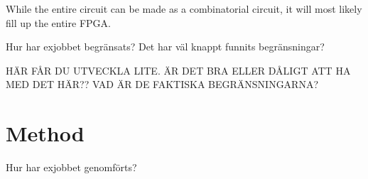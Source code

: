 While the entire circuit can be made as a combinatorial circuit, it 
will most likely fill up the entire FPGA.

Hur har exjobbet begränsats? Det har väl knappt funnits begränsningar?

HÄR FÅR DU UTVECKLA LITE. ÄR DET BRA ELLER DÅLIGT ATT HA MED DET HÄR?? 
VAD ÄR DE FAKTISKA BEGRÄNSNINGARNA?

\section{Method}
Hur har exjobbet genomförts?

